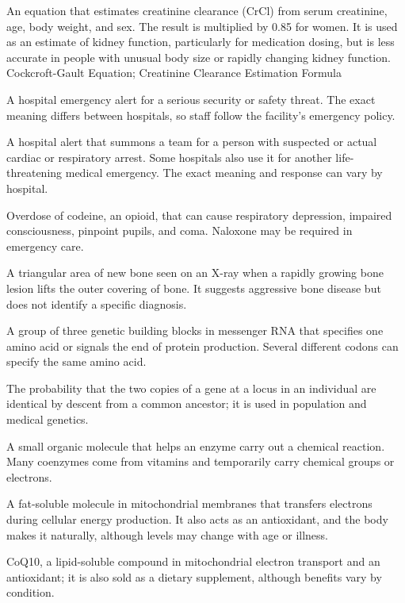  An equation that estimates creatinine clearance (CrCl) from serum creatinine, age, body weight, and sex. The result is multiplied by 0.85 for women. It is used as an estimate of kidney function, particularly for medication dosing, but is less accurate in people with unusual body size or rapidly changing kidney function.
\synonyms
Cockcroft-Gault Equation; Creatinine Clearance Estimation Formula

 A hospital emergency alert for a serious security or safety threat. The exact meaning differs between hospitals, so staff follow the facility's emergency policy.

 A hospital alert that summons a team for a person with suspected or actual cardiac or respiratory arrest. Some hospitals also use it for another life-threatening medical emergency. The exact meaning and response can vary by hospital.

 Overdose of codeine, an opioid, that can cause respiratory depression, impaired consciousness, pinpoint pupils, and coma. Naloxone may be required in emergency care.

 A triangular area of new bone seen on an X-ray when a rapidly growing bone lesion lifts the outer covering of bone. It suggests aggressive bone disease but does not identify a specific diagnosis.

 A group of three genetic building blocks in messenger RNA that specifies one amino acid or signals the end of protein production. Several different codons can specify the same amino acid.

 The probability that the two copies of a gene at a locus in an individual are identical by descent from a common ancestor; it is used in population and medical genetics.

 A small organic molecule that helps an enzyme carry out a chemical reaction. Many coenzymes come from vitamins and temporarily carry chemical groups or electrons.

 A fat-soluble molecule in mitochondrial membranes that transfers electrons during cellular energy production. It also acts as an antioxidant, and the body makes it naturally, although levels may change with age or illness.

 CoQ10, a lipid-soluble compound in mitochondrial electron transport and an antioxidant; it is also sold as a dietary supplement, although benefits vary by condition.

